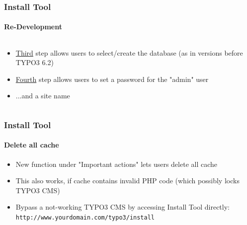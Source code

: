\begin{frame}[fragile]
	\frametitle{Install Tool}
	\framesubtitle{Re-Development}

	\begin{columns}[T]

		\begin{column}{.5\textwidth}
			\begin{itemize}
				\item \underline{Third} step allows users to select/create the database\newline
					(as in versions before TYPO3 6.2)
				\item \underline{Fourth} step allows users to set a password for the "admin" user
				\item ...and a site name
			\end{itemize}
		\end{column}

		\begin{column}{.5\textwidth}
		\end{column}

	\end{columns}

\end{frame}


\begin{frame}[fragile]
	\frametitle{Install Tool}
	\framesubtitle{Delete all cache}

	\begin{itemize}
		\item New function under "Important actions" lets users delete all cache
		\item This also works, if cache contains invalid PHP code\newline
			(which possibly locks TYPO3 CMS)
		\item Bypass a not-working TYPO3 CMS by accessing Install Tool directly:\newline
			\texttt{http://www.yourdomain.com/typo3/install}

	\end{itemize}


\end{frame}

